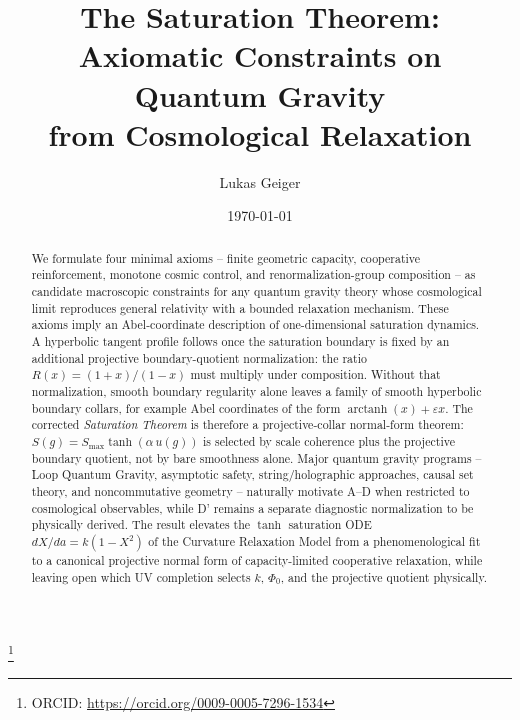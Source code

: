 \documentclass[aps,prd,twocolumn,superscriptaddress,nofootinbib]{revtex4-2}
\begin{document}

\title{The Saturation Theorem: Axiomatic Constraints on Quantum Gravity\\from Cosmological Relaxation}

\author{Lukas Geiger}
\thanks{ORCID: \url{https://orcid.org/0009-0005-7296-1534}}

\date{\today}

\begin{abstract}
We formulate four minimal axioms -- finite geometric capacity, cooperative reinforcement, monotone cosmic control, and renormalization-group composition -- as candidate macroscopic constraints for any quantum gravity theory whose cosmological limit reproduces general relativity with a bounded relaxation mechanism. These axioms imply an Abel-coordinate description of one-dimensional saturation dynamics. A hyperbolic tangent profile follows once the saturation boundary is fixed by an additional projective boundary-quotient normalization: the ratio $R(x)=(1+x)/(1-x)$ must multiply under composition. Without that normalization, smooth boundary regularity alone leaves a family of smooth hyperbolic boundary collars, for example Abel coordinates of the form $\operatorname{arctanh}(x)+\varepsilon x$. The corrected \textit{Saturation Theorem} is therefore a projective-collar normal-form theorem: $S(g)=S_{\max}\tanh(\alpha\,u(g))$ is selected by scale coherence plus the projective boundary quotient, not by bare smoothness alone. Major quantum gravity programs -- Loop Quantum Gravity, asymptotic safety, string/holographic approaches, causal set theory, and noncommutative geometry -- naturally motivate A--D when restricted to cosmological observables, while D' remains a separate diagnostic normalization to be physically derived. The result elevates the $\tanh$ saturation ODE $dX/da = k(1-X^2)$ of the Curvature Relaxation Model from a phenomenological fit to a canonical projective normal form of capacity-limited cooperative relaxation, while leaving open which UV completion selects $k$, $\Phi_0$, and the projective quotient physically.
\end{abstract}

\end{document}
